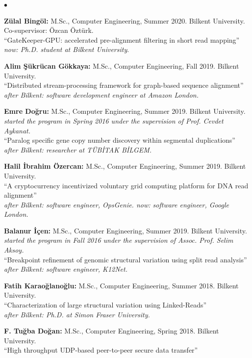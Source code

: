 \documentclass[margin,line]{res}
\newenvironment{list2}{
  \begin{list}{$\bullet$}{%
      \setlength{\itemsep}{0.1cm}
      \setlength{\parsep}{0in} \setlength{\parskip}{0in}
      \setlength{\topsep}{0in} \setlength{\partopsep}{0in} 
      \setlength{\leftmargin}{0.2in}}}{\end{list}}
\begin{document}
\begin{resume}
\begin{list2}
\item
  {\bf Zülal Bingöl:} M.Sc., Computer Engineering, Summer 2020. Bilkent University. Co-supervisor: Özcan Öztürk.\\
  ``GateKeeper-GPU: accelerated pre-alignment filtering in short read mapping''\\
  {\it now: Ph.D. student at Bilkent University}.
\item
  {\bf Alim Şükrücan Gökkaya:} M.Sc., Computer Engineering, Fall 2019.
  Bilkent University. \\
  ``Distributed stream-processing framework for graph-based sequence alignment''\\
  {\it after Bilkent: software development engineer at Amazon London.}
\item
  {\bf Emre Doğru:} M.Sc., Computer Engineering, Summer 2019.
  Bilkent University. {\it started the program in Spring 2016 under the supervision of Prof. Cevdet Aykanat.}\\
  ``Paralog specific gene copy number discovery within segmental duplications''\\
  {\it after Bilkent: researcher at TÜBİTAK BİLGEM.}

\item
  {\bf Halil İbrahim Özercan:} M.Sc., Computer Engineering, Summer 2019.
  Bilkent University. \\
  ``A cryptocurrency incentivized voluntary grid computing platform for DNA read alignment''\\
  {\it after Bilkent: software engineer, OpsGenie. now: software engineer, Google London.}

\item
  {\bf Balanur İçen:} M.Sc., Computer Engineering, Summer 2019.
  Bilkent University. {\it started the program in Fall 2016 under the supervision of Assoc. Prof. Selim Aksoy.}\\
  ``Breakpoint refinement of genomic structural variation using split read analysis'' \\
  {\it after Bilkent: software engineer, K12Net.}

\item
  {\bf Fatih Karaoğlanoğlu:} M.Sc., Computer Engineering, Summer 2018.
  Bilkent University. \\
  ``Characterization of large structural variation using Linked-Reads''\\
  {\it after Bilkent: Ph.D. at Simon Fraser University.}
  
\item
  {\bf F. Tuğba Doğan:} M.Sc., Computer Engineering, Spring 2018.
  Bilkent University. \\
  ``High throughput UDP-based peer-to-peer secure data transfer''
  

\end{list2}
\end{resume}
\end{document}

